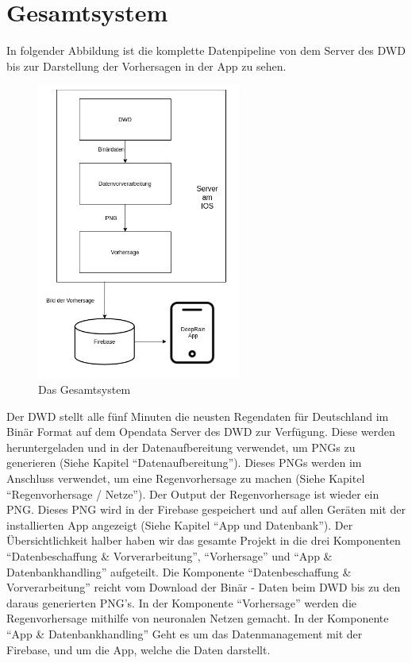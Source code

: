 \section{Gesamtsystem}\label{gesamtsystem}
In folgender Abbildung ist die komplette Datenpipeline von dem Server des DWD bis zur Darstellung der Vorhersagen in der App zu sehen.  

\begin{figure}[htb]
 \centering
 \includegraphics[width=0.6\textwidth,angle=0]{abb/Gesamtsystem}
 \caption[Das Gesamtsystem]{Das Gesamtsystem}
\label{fig:Beschreibung}
\end{figure}
\begin{sloppypar}
    \noindent
    Der DWD stellt alle fünf Minuten die neusten Regendaten für Deutschland im Binär Format auf dem Opendata Server des DWD zur Verfügung. 
    Diese werden heruntergeladen und in der Datenaufbereitung verwendet, um PNGs zu generieren (Siehe Kapitel “Datenaufbereitung”). 
    Dieses PNGs werden im Anschluss verwendet, um eine Regenvorhersage zu machen (Siehe Kapitel “Regenvorhersage / Netze”). 
    Der Output der Regenvorhersage ist wieder ein PNG. 
    Dieses PNG wird in der Firebase gespeichert und auf allen Geräten mit der installierten App angezeigt (Siehe Kapitel “App und Datenbank”). 
    Der Übersichtlichkeit halber haben wir das gesamte Projekt in die drei Komponenten “Datenbeschaffung \& Vorverarbeitung”, “Vorhersage” und
    “App \& Datenbankhandling” aufgeteilt. 
    Die Komponente “Datenbeschaffung \& Vorverarbeitung” reicht vom Download der Binär - Daten beim DWD bis zu den daraus generierten PNG’s. 
    In der Komponente “Vorhersage” werden die Regenvorhersage mithilfe von neuronalen Netzen gemacht. In der Komponente “App \& Datenbankhandling” 
    Geht es um das Datenmanagement mit der Firebase, und um die App, welche die Daten darstellt.
\end{sloppypar}